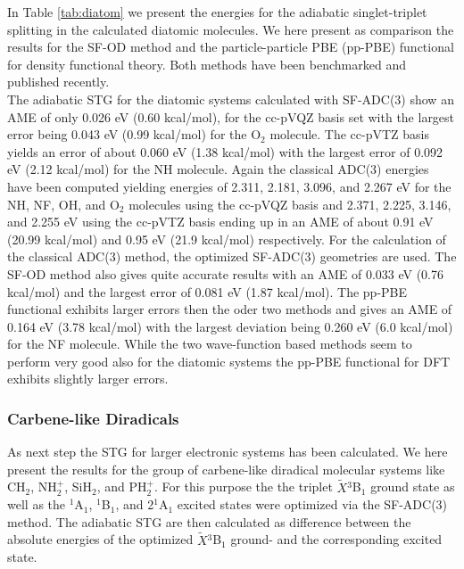 \documentclass[aip,graphicx,amsmath,reprint]{revtex4-1}
\begin{document}
In Table \ref{tab:diatom} we present the energies for the adiabatic singlet-triplet splitting in the calculated diatomic molecules. We here present as comparison the results for the SF-OD method and the particle-particle PBE (pp-PBE) functional for density functional theory. Both methods have been benchmarked and published recently.\cite{Krylov2002,Yang2015}\\
The adiabatic STG for the diatomic systems calculated with SF-ADC(3) show an AME of only 0.026 eV (0.60 kcal/mol), for the cc-pVQZ basis set with the largest error being 0.043 eV (0.99 kcal/mol) for the O$_2$ molecule. The cc-pVTZ basis yields an error of about 0.060 eV (1.38 kcal/mol) with the largest error of 0.092 eV (2.12 kcal/mol) for the NH molecule. Again the classical ADC(3) energies have been computed yielding energies of 2.311, 2.181, 3.096, and 2.267 eV for the NH, NF, OH, and O$_2$ molecules using the cc-pVQZ basis and 2.371, 2.225, 3.146, and 2.255 eV using the cc-pVTZ basis ending up in an AME of about 0.91 eV (20.99 kcal/mol) and 0.95 eV (21.9 kcal/mol) respectively. For the calculation of the classical ADC(3) method, the optimized SF-ADC(3) geometries are used. The SF-OD method also gives quite accurate results with an AME of 0.033 eV (0.76 kcal/mol) and the largest error of 0.081 eV (1.87 kcal/mol). The pp-PBE functional exhibits larger errors then the oder two methods and gives an AME of 0.164 eV (3.78 kcal/mol) with the largest deviation being 0.260 eV (6.0 kcal/mol) for the NF molecule. While the two wave-function based methods seem to perform very good also for the diatomic systems the pp-PBE functional for DFT exhibits slightly larger errors. 

\subsubsection{Carbene-like Diradicals}
As next step the STG for larger electronic systems has been calculated. We here present the results for the group of carbene-like diradical molecular systems like CH$_2$, NH$_2^+$, SiH$_2$, and PH$_2^+$. For this purpose the the triplet ${\tilde{X}}$$^3$B$_1$ ground state as well as the $^1$A$_1$, $^1$B$_1$, and 2$^1$A$_1$ excited states were optimized via the SF-ADC(3) method. The adiabatic STG are then calculated as difference between the absolute energies of the optimized ${\tilde{X}}$$^3$B$_1$ ground- and the corresponding excited state.\\
\end{document}
